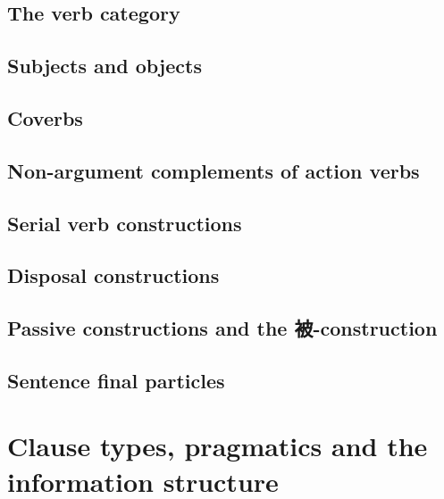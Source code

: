 \documentclass[UTF8, a4paper, oneside, scheme=plain]{ctexbook}
\numberwithin{equation}{chapter}
\numberwithin{equation}{chapter}
\begin{document}


\chapter{The verb category}



\chapter{Subjects and objects}%

\chapter{Coverbs}



\chapter{Non-argument complements of action verbs}



\chapter{Serial verb constructions} %

\chapter{Disposal constructions}\label{chap:disposal}

\chapter{Passive constructions and the 被-construction}\label{chap:passive}

\chapter{Sentence final particles}




\part{Clause types, pragmatics and the information structure}%
\end{document}
